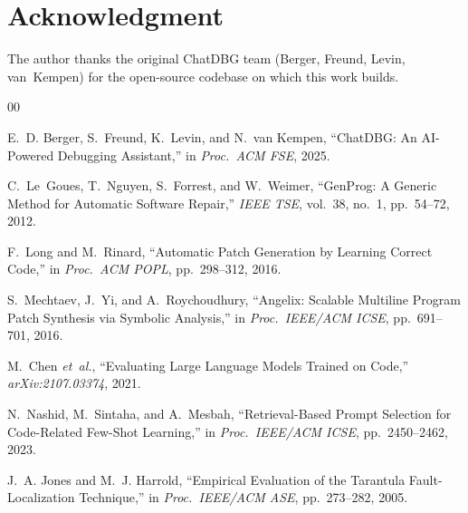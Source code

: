 \documentclass[conference]{IEEEtran}
\begin{document}
\section*{Acknowledgment}
The author thanks the original ChatDBG team (Berger, Freund, Levin, van~Kempen)
for the open-source codebase on which this work builds.

\begin{thebibliography}{00}

E.~D. Berger, S.~Freund, K.~Levin, and N.~van Kempen,
``ChatDBG: An AI-Powered Debugging Assistant,''
in \textit{Proc.\ ACM FSE}, 2025.

C.~Le~Goues, T.~Nguyen, S.~Forrest, and W.~Weimer,
``GenProg: A Generic Method for Automatic Software Repair,''
\textit{IEEE TSE}, vol.~38, no.~1, pp.~54--72, 2012.

F.~Long and M.~Rinard,
``Automatic Patch Generation by Learning Correct Code,''
in \textit{Proc.\ ACM POPL}, pp.~298--312, 2016.

S.~Mechtaev, J.~Yi, and A.~Roychoudhury,
``Angelix: Scalable Multiline Program Patch Synthesis via Symbolic Analysis,''
in \textit{Proc.\ IEEE/ACM ICSE}, pp.~691--701, 2016.

M.~Chen \textit{et~al.},
``Evaluating Large Language Models Trained on Code,''
\textit{arXiv:2107.03374}, 2021.

N.~Nashid, M.~Sintaha, and A.~Mesbah,
``Retrieval-Based Prompt Selection for Code-Related Few-Shot Learning,''
in \textit{Proc.\ IEEE/ACM ICSE}, pp.~2450--2462, 2023.

J.~A. Jones and M.~J. Harrold,
``Empirical Evaluation of the Tarantula Fault-Localization Technique,''
in \textit{Proc.\ IEEE/ACM ASE}, pp.~273--282, 2005.

\end{thebibliography}
\end{document}
